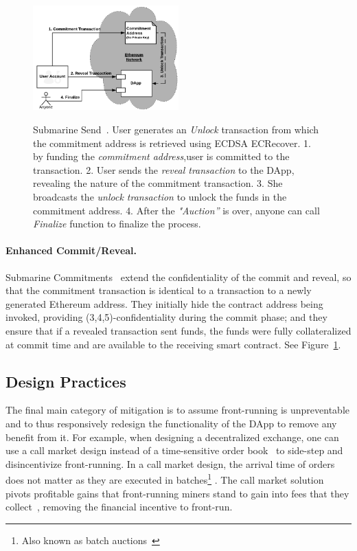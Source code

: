 \begin{figure}[h]
    \centering
{\caption[Submarine Send]{Submarine Send~\cite{libsubmarine}. User generates an \textit{Unlock} transaction from which the commitment address is retrieved using ECDSA ECRecover. \textsf{1.} by funding the \textit{commitment address},user is committed to the transaction. \textsf{2.} User sends the \textit{reveal transaction} to the DApp, revealing the nature of the commitment transaction. \textsf{3.} She broadcasts the \textit{unlock transaction} to unlock the funds in the commitment address. \textsf{4.} After the \textit{"Auction''} is over, anyone can call \textit{Finalize} function to finalize the process.}\label{fig:LibSubmarine}}
{\includegraphics[width=0.5\textwidth]{figures/LibSubmarine.png}}
\end{figure}


\paragraph{Enhanced Commit/Reveal.} Submarine Commitments~\cite{libsubmarine,submarinesendHD} extend the confidentiality of the commit and reveal, so that the commitment transaction is identical to a transaction to a newly generated Ethereum address. They initially hide the contract address being invoked, providing (3,4,5)-confidentiality during the commit phase; and they ensure that if a revealed transaction sent funds, the funds were fully collateralized at commit time and are available to the receiving smart contract. See Figure~\ref{fig:LibSubmarine}.

\subsection{Design Practices}

The final main category of mitigation is to assume front-running is unpreventable and to thus responsively redesign the functionality of the DApp to remove any benefit from it. For example, when designing a decentralized exchange, one can use a call market design instead of a time-sensitive order book~\cite{clark2014decentralizing} to side-step and disincentivize front-running. In a call market design, the arrival time of orders does not matter as they are executed in batches\footnote{Also known as batch auctions~\cite{batchAuctions18}} . The call market solution pivots profitable gains that front-running miners stand to gain into fees that they collect~\cite{clark2014decentralizing}, removing the financial incentive to front-run.

